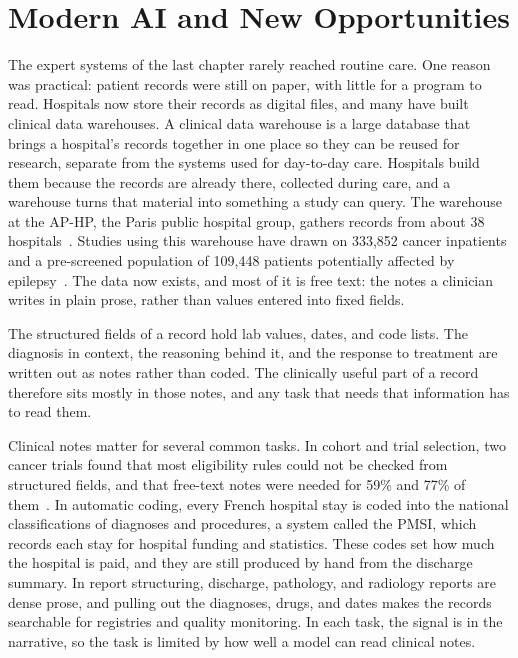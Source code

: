 \chapter{Modern AI and New Opportunities}
\label{chap:modern-ai}

\begin{reviewrewrite}
The expert systems of the last chapter rarely reached routine care. One reason was practical: patient records were still on paper, with little for a program to read. Hospitals now store their records as digital files, and many have built clinical data warehouses. A clinical data warehouse is a large database that brings a hospital's records together in one place so they can be reused for research, separate from the systems used for day-to-day care. Hospitals build them because the records are already there, collected during care, and a warehouse turns that material into something a study can query. The warehouse at the AP-HP, the Paris public hospital group, gathers records from about 38 hospitals~\citep{aphp_cdw,larosa_multimodal_2025,legac_comparing_2026}. Studies using this warehouse have drawn on 333{,}852 cancer inpatients and a pre-screened population of 109{,}448 patients potentially affected by epilepsy~\citep{larosa_multimodal_2025,legac_comparing_2026}. The data now exists, and most of it is free text: the notes a clinician writes in plain prose, rather than values entered into fixed fields.
\end{reviewrewrite}

\begin{reviewrewrite}
The structured fields of a record hold lab values, dates, and code lists. The diagnosis in context, the reasoning behind it, and the response to treatment are written out as notes rather than coded. The clinically useful part of a record therefore sits mostly in those notes, and any task that needs that information has to read them.
\end{reviewrewrite}

\begin{reviewrewrite}
Clinical notes matter for several common tasks. In cohort and trial selection, two cancer trials found that most eligibility rules could not be checked from structured fields, and that free-text notes were needed for 59\% and 77\% of them~\citep{raghavan_how_2014}. In automatic coding, every French hospital stay is coded into the national classifications of diagnoses and procedures, a system called the PMSI, which records each stay for hospital funding and statistics. These codes set how much the hospital is paid, and they are still produced by hand from the discharge summary. In report structuring, discharge, pathology, and radiology reports are dense prose, and pulling out the diagnoses, drugs, and dates makes the records searchable for registries and quality monitoring. In each task, the signal is in the narrative, so the task is limited by how well a model can read clinical notes.
\end{reviewrewrite}

